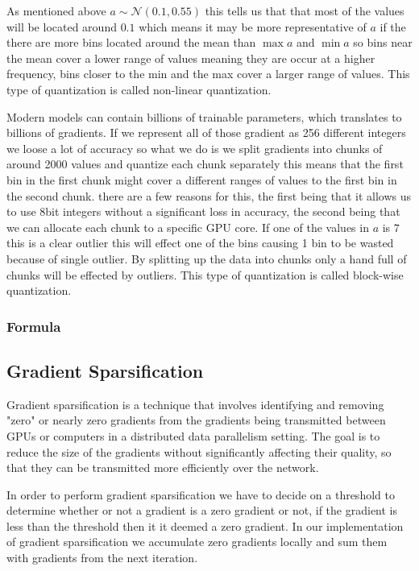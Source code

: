 \documentclass[11pt]{article}
\begin{document}
As mentioned above $a \sim \mathcal{N}(0.1,0.55)$ this tells us that that most of the values will be located around $0.1$ which means it may be more representative of $a$ if the there are more bins located around the mean than $\max a$ and $\min a$ so bins near the mean cover a lower range of values meaning they are occur at a higher frequency, bins closer to the min and the max cover a larger range of values. This type of quantization is called non-linear quantization.

Modern models can contain billions of trainable parameters, which translates to billions of gradients. If we represent all of those gradient as 256 different integers we loose a lot of accuracy so what we do is we split gradients into chunks of around 2000 values and quantize each chunk separately this means that the first bin in the first chunk might cover a different ranges of values to the first bin in the second chunk. there are a few reasons for this, the first being that it allows us to use 8bit integers without a significant loss in accuracy, the second being that we can allocate each chunk to a specific GPU core. If one of the values in $a$ is $7$ this is a clear outlier this will effect one of the bins causing 1 bin to be wasted because of single outlier. By splitting up the data into chunks only a hand full of chunks will be effected by outliers. This type of quantization is called block-wise quantization.


\subsubsection{Formula}




\subsection{Gradient Sparsification}
Gradient sparsification is a technique that involves identifying and removing "zero" or nearly zero gradients from the gradients being transmitted between GPUs or computers in a distributed data parallelism setting. The goal is to reduce the size of the gradients without significantly affecting their quality, so that they can be transmitted more efficiently over the network.

In order to perform gradient sparsification we have to decide on a threshold to determine whether or not a gradient is a zero gradient or not, if the gradient is less than the threshold then it it deemed a zero gradient. In our implementation of gradient sparsification we accumulate zero gradients locally and sum them with gradients from the next iteration. 
\end{document}
